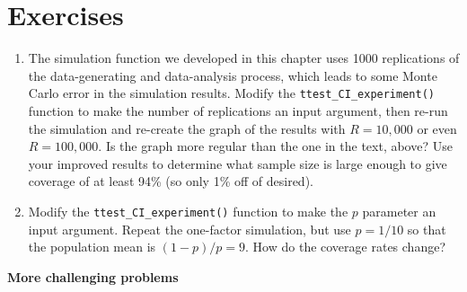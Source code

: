 \documentclass[
]{book}
\begin{document}
\section{Exercises}\label{exercises-1}

\begin{enumerate}
\def\labelenumi{\arabic{enumi}.}
\item
  The simulation function we developed in this chapter uses 1000 replications of the data-generating and data-analysis process, which leads to some Monte Carlo error in the simulation results. Modify the \texttt{ttest\_CI\_experiment()} function to make the number of replications an input argument, then re-run the simulation and re-create the graph of the results with \(R=10,000\) or even \(R=100,000\). Is the graph more regular than the one in the text, above?
  Use your improved results to determine what sample size is large enough to give coverage of at least 94\% (so only 1\% off of desired).
\item
  Modify the \texttt{ttest\_CI\_experiment()} function to make the \(p\) parameter an input argument. Repeat the one-factor simulation, but use \(p = 1/10\) so that the population mean is \((1 - p) / p = 9\). How do the coverage rates change?
\end{enumerate}

\textbf{More challenging problems}
\end{document}
